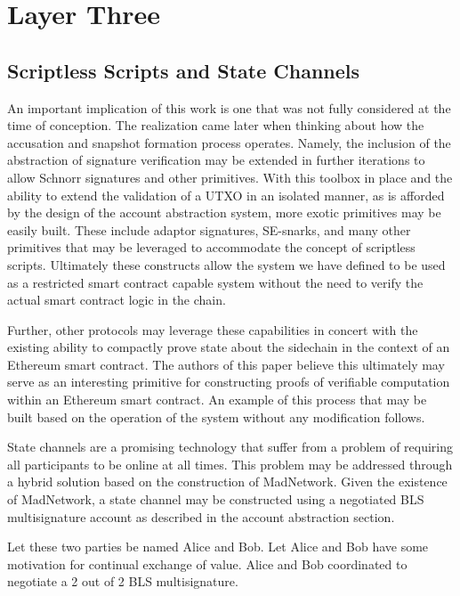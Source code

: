 \section{Layer Three}

\subsection{Scriptless Scripts and State Channels}

An important implication of this work is one that was not fully
considered at the time of conception.
The realization came later when thinking about how the accusation and
snapshot formation process operates.
Namely, the inclusion of the abstraction of signature verification may
be extended in further iterations to allow Schnorr signatures and other
primitives.
With this toolbox in place and the ability to extend the validation of
a UTXO in an isolated manner, as is afforded by the design of the
account abstraction system, more exotic primitives may be easily built.
These include adaptor signatures, SE-snarks, and many other primitives
that may be leveraged to accommodate the concept of scriptless scripts.
Ultimately these constructs allow the system we have defined to be used
as a restricted smart contract capable system without the need to
verify the actual smart contract logic in the chain.

Further, other protocols may leverage these capabilities in concert
with the existing ability to compactly prove state about the sidechain
in the context of an Ethereum smart contract.
The authors of this paper believe this ultimately may serve as an
interesting primitive for constructing proofs of verifiable computation
within an Ethereum smart contract.
An example of this process that may be built based on the operation of
the system without any modification follows.

State channels are a promising technology that suffer from a problem of
requiring all participants to be online at all times.
This problem may be addressed through a hybrid solution based on the
construction of MadNetwork.
Given the existence of MadNetwork, a state channel may be constructed
using a negotiated BLS multisignature account as described in the
account abstraction section.

Let these two parties be named Alice and Bob.
Let Alice and Bob have some motivation for continual exchange of value.
Alice and Bob coordinated to negotiate a 2 out of 2 BLS multisignature.

